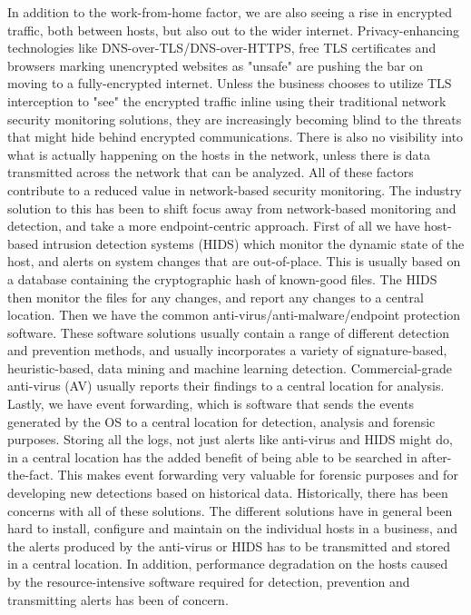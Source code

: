 In addition to the work-from-home factor, we are also seeing a rise in encrypted traffic, both between hosts, but also out to the wider internet. Privacy-enhancing technologies like DNS-over-TLS/DNS-over-HTTPS, free TLS certificates and browsers marking unencrypted websites as "unsafe" are pushing the bar on moving to a fully-encrypted internet. Unless the business chooses to utilize TLS interception to "see" the encrypted traffic inline using their traditional network security monitoring solutions, they are increasingly becoming blind to the threats that might hide behind encrypted communications. There is also no visibility into what is actually happening on the hosts in the network, unless there is data transmitted across the network that can be analyzed. All of these factors contribute to a reduced value in network-based security monitoring.
The industry solution to this has been to shift focus away from network-based monitoring and detection, and take a more endpoint-centric approach.
First of all we have host-based intrusion detection systems (HIDS) which monitor the dynamic state of the host, and alerts on system changes that are out-of-place. This is usually based on a database containing the cryptographic hash of known-good files. The HIDS then monitor the files for any changes, and report any changes to a central location. Then we have the common anti-virus/anti-malware/endpoint protection software. These software solutions usually contain a range of different detection and prevention methods, and usually incorporates a variety of signature-based, heuristic-based, data mining and machine learning detection. Commercial-grade anti-virus (AV) usually reports their findings to a central location for analysis. Lastly, we have event forwarding, which is software that sends the events generated by the OS to a central location for detection, analysis and forensic purposes. Storing all the logs, not just alerts like anti-virus and HIDS might do, in a central location has the added benefit of being able to be searched in after-the-fact. This makes event forwarding very valuable for forensic purposes and for developing new detections based on historical data.
Historically, there has been concerns with all of these solutions. The different solutions have in general been hard to install, configure and maintain on the individual hosts in a business, and the alerts produced by the anti-virus or HIDS has to be transmitted and stored in a central location. In addition, performance degradation on the hosts caused by the resource-intensive software required for detection, prevention and transmitting alerts has been of concern.
